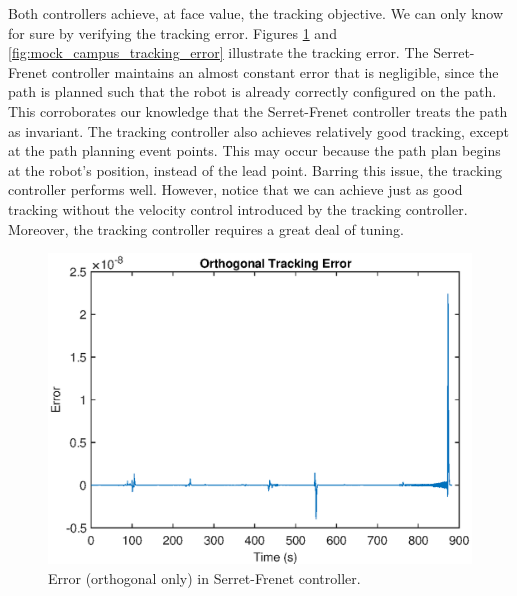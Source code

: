\documentclass[oneside, 11pt]{book}
\begin{document}
Both controllers achieve, at face value, the tracking objective. We can only know for sure by verifying the tracking error. Figures \ref{fig:mock_campus_serret_frenet_error} and \ref{fig:mock_campus_tracking_error} illustrate the tracking error. The Serret-Frenet controller maintains an almost constant error that is negligible, since the path is planned such that the robot is already correctly configured on the path. This corroborates our knowledge that the Serret-Frenet controller treats the path as invariant. The tracking controller also achieves relatively good tracking, except at the path planning event points. This may occur because the path plan begins at the robot's position, instead of the lead point. Barring this issue, the tracking controller performs well. However, notice that we can achieve just as good tracking without the velocity control introduced by the tracking controller. Moreover, the tracking controller requires a great deal of tuning.
\begin{figure}[!htbp]
    \centering
    \includegraphics{images/campus_serret_frenet_error.eps}
    \caption{Error (orthogonal only) in Serret-Frenet controller.}
    \label{fig:mock_campus_serret_frenet_error}
\end{figure}
\end{document}
